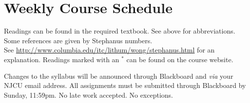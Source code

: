 \documentclass[article,oneside]{memoir}
\begin{document}
\section{Weekly Course Schedule}
Readings can be found in the required textbook. See above for abbreviations. Some references are given by Stephanus numbers.\\ See \href{http://www.columbia.edu/itc/lithum/wong/stephanus.html}{http://www.columbia.edu/itc/lithum/wong/stephanus.html} for an explanation. Readings marked with an $^{*}$ can be found on the course website.

 Changes to the syllabus will be announced through Blackboard and \emph{via} your NJCU email address.  All assignments must be submitted through Blackboard by Sunday, 11:59pm. No late work accepted. No exceptions.  
\end{document}
